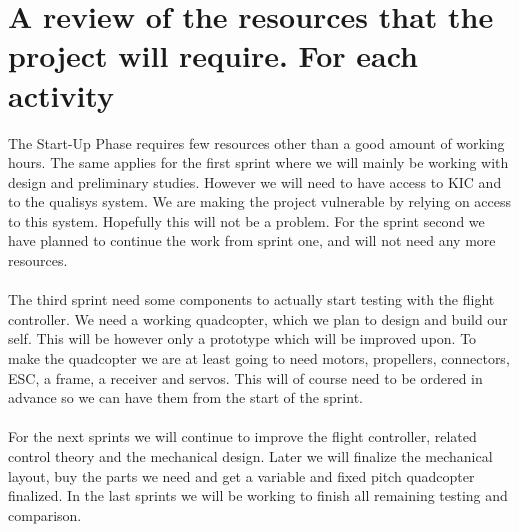 \section{A review of the resources that the project will require. For each activity}

The Start-Up Phase requires few resources other than a good amount of working hours. The same applies for the first sprint where we will mainly be working with design and preliminary studies. However we will need to have access to KIC and to the qualisys system. We are making the project vulnerable by relying on access to this system. Hopefully this will not be a problem. 
For the sprint second we have planned to continue the work from sprint one, and will not need any more resources. \\
\\
The third sprint need some components to actually start testing with the flight controller. We need a working quadcopter, which we plan to design and build our self. This will be however only a prototype which will be improved upon. To make the quadcopter we are at least going to need motors, propellers, connectors, ESC, a frame, a receiver and servos. This will of course need to be ordered in advance so we can have them from the start of the sprint. \\
\\ 
For the next sprints we will continue to improve the flight controller, related control theory and the mechanical design. 
Later we will finalize the mechanical layout, buy the parts we need and get a variable and fixed pitch quadcopter finalized. 
In the last sprints we will be working to finish all remaining testing and comparison. 